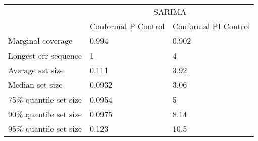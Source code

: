 \begin{tabular}{lll}
\toprule
& \multicolumn{2}{c}{SARIMA} \\
& Conformal P Control & Conformal PI Control \\
\midrule
Marginal coverage & 0.994 & 0.902 \\
Longest err sequence & 1 & 4 \\
Average set size & 0.111 & 3.92 \\
Median set size & 0.0932 & 3.06 \\
75\% quantile set size & 0.0954 & 5 \\
90\% quantile set size & 0.0975 & 8.14 \\
95\% quantile set size & 0.123 & 10.5 \\
\bottomrule
\end{tabular}
